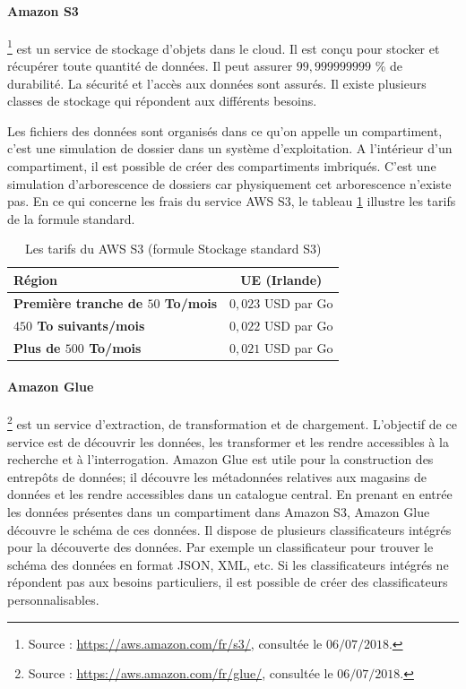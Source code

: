 \paragraph{Amazon S3}
\footnote{Source : \url{https://aws.amazon.com/fr/s3/}, consultée le $06/07/2018$.} est un service de stockage d'objets dans le cloud. Il est conçu pour stocker et  récupérer toute quantité de données. Il peut assurer $ 99,999999999 $ \% de durabilité. La sécurité  et l'accès aux données sont assurés. Il existe plusieurs classes de stockage qui répondent aux différents besoins. 


Les fichiers des données sont organisés dans ce qu'on appelle un compartiment, c'est une simulation de dossier dans un système d'exploitation. A l'intérieur d'un compartiment, il est possible de créer des compartiments imbriqués. C'est une simulation d'arborescence de dossiers car physiquement cet arborescence n'existe pas. En ce qui concerne les frais du service AWS S3, le tableau   	\ref{tab:pricing-s3-standard} illustre les tarifs de la formule standard.
\begin{table}[H]
	\centering
	\captionsetup{justification=centering}
	\begin{tabular}{l c }
		\textbf{Région} & UE (Irlande) \\ \hline
		\textbf{Première tranche de $ 50 $ To/mois} &	$ 0,023 $ USD par Go\\ \hline
		\textbf{$ 450 $ To suivants/mois} &	$ 0,022 $ USD par Go \\ \hline
		\textbf{Plus de $ 500 $ To/mois} &	$ 0,021 $ USD par Go\\ \hline
	\end{tabular}
	\caption{Les tarifs du AWS S3 (formule Stockage standard S3)}
	\label{tab:pricing-s3-standard}
\end{table}


\paragraph{Amazon  Glue} \label{aws:glue}
\footnote{Source : \url{https://aws.amazon.com/fr/glue/}, consultée le $06/07/2018$.} est un service d'extraction, de transformation et de chargement. L'objectif de ce service est de découvrir les données, les transformer et les rendre accessibles à la recherche et à l'interrogation.  Amazon Glue  est utile pour la construction des entrepôts de données; il découvre les métadonnées relatives aux magasins de données et les rendre accessibles dans un catalogue central. En prenant en entrée les données  présentes dans un compartiment dans Amazon S3, Amazon Glue découvre le schéma de ces données. Il dispose de plusieurs classificateurs intégrés pour la découverte des données. Par exemple un classificateur pour trouver le schéma  des données en format JSON, XML, etc. Si les classificateurs intégrés ne répondent pas aux besoins particuliers, il est possible de créer des classificateurs personnalisables. 

